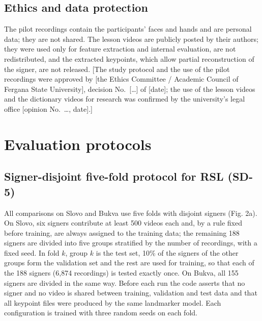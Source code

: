 \documentclass[a4paper,fleqn]{cas-dc}
\begin{document}
\hypertarget{ethics-and-data-protection}{%
\subsection{Ethics and data protection}\label{ethics-and-data-protection}}

The pilot recordings contain the participants' faces and hands and are personal data; they are not shared. The lesson videos are publicly posted by their authors; they were used only for feature extraction and internal evaluation, are not redistributed, and the extracted keypoints, which allow partial reconstruction of the signer, are not released. {\color{red}[The study protocol and the use of the pilot recordings were approved by {\color{red}[the Ethics Committee / Academic Council of Fergana State University]}, decision No.~{\color{red}[\ldots]} of {\color{red}[date]}; the use of the lesson videos and the dictionary videos for research was confirmed by the university's legal office {\color{red}[opinion No.~\ldots, date]}.]}

\hypertarget{evaluation-protocols}{%
\section{Evaluation protocols}\label{evaluation-protocols}}

\hypertarget{signer-disjoint-five-fold-protocol-for-rsl-sd-5}{%
\subsection{Signer-disjoint five-fold protocol for RSL (SD-5)}\label{signer-disjoint-five-fold-protocol-for-rsl-sd-5}}

All comparisons on Slovo and Bukva use five folds with disjoint signers (Fig. 2a). On Slovo, six signers contribute at least 500 videos each and, by a rule fixed before training, are always assigned to the training data; the remaining 188 signers are divided into five groups stratified by the number of recordings, with a fixed seed. In fold \(k\), group \(k\) is the test set, 10\% of the signers of the other groups form the validation set and the rest are used for training, so that each of the 188 signers (6,874 recordings) is tested exactly once. On Bukva, all 155 signers are divided in the same way. Before each run the code asserts that no signer and no video is shared between training, validation and test data and that all keypoint files were produced by the same landmarker model. Each configuration is trained with three random seeds on each fold.
\end{document}
